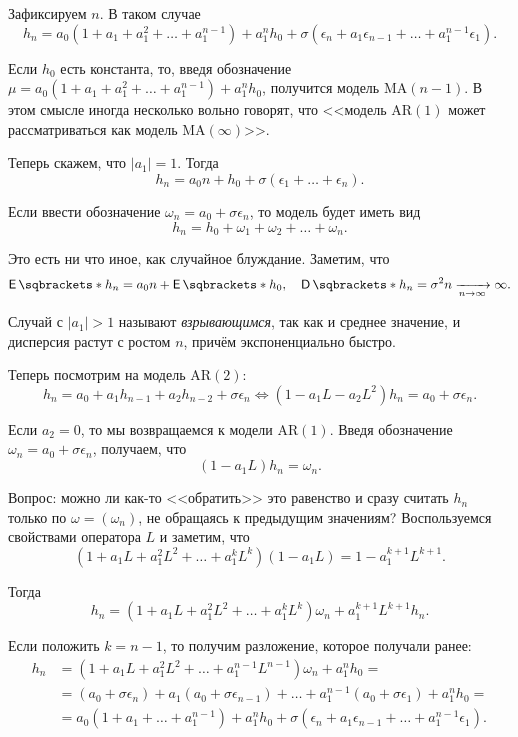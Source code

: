 Зафиксируем \(n\). В таком случае
\[
	h_{n} = a_{0}(1 + a_{1} + a_{1}^{2} + \ldots + a_{1}^{n - 1}) + 
	a_{1}^{n}h_{0} + \sigma(\epsilon_{n} + a_{1}\epsilon_{n - 1}+ \ldots + 
	a_{1}^{n - 1}\epsilon_{1}).
\]

Если \(h_{0}\) есть константа, то, введя обозначение \(\mu = a_{0}(1 + a_{1} + 
a_{1}^{2} + \ldots + a_{1}^{n - 1}) + a_{1}^{n}h_{0}\), получится модель 
\(\mathrm{MA}(n - 1)\). В этом смысле иногда несколько вольно говорят, что 
<<модель \(\mathrm{AR}(1)\) может рассматриваться как модель 
\(\mathrm{MA}(\infty)\)>>.

Теперь скажем, что \(|a_{1}| = 1\). Тогда
\[
	h_{n} = a_{0}n + h_{0} + \sigma(\epsilon_{1} + \ldots + \epsilon_{n}).
\]

Если ввести обозначение \(\omega_{n} = a_{0} + \sigma\epsilon_{n}\), то модель 
будет иметь вид
\[
	h_{n} = h_{0} + \omega_{1} + \omega_{2} + \ldots + \omega_{n}.
\]

Это есть ни что иное, как случайное блуждание. Заметим, что
\[
	\E{h_{n}} = a_{0}n + \E{h_{0}}, \quad \D{h_{n}} = \sigma^{2}n 
	\xrightarrow[n \to \infty]{} \infty.
\]

Случай с \(|a_{1}| > 1\) называют \emph{взрывающимся}, так как и среднее 
значение, и дисперсия растут с ростом \(n\), причём экспоненциально быстро.

Теперь посмотрим на модель \(\mathrm{AR}(2)\):
\[
	h_{n} = a_{0} + a_{1}h_{n - 1} + a_{2}h_{n - 2} + \sigma\epsilon_{n} \iff 
	(1 - a_{1}L - a_{2}L^{2})h_{n} = a_{0} + \sigma\epsilon_{n}.
\]

Если \(a_{2} = 0\), то мы возвращаемся к модели \(\mathrm{AR}(1)\). Введя 
обозначение \(\omega_{n} = a_{0} + \sigma\epsilon_{n}\), получаем, что
\[
	(1 - a_{1}L)h_{n} = \omega_{n}.
\]

Вопрос: можно ли как-то <<обратить>> это равенство и сразу считать \(h_{n}\) 
только по \(\omega = (\omega_{n})\), не обращаясь к предыдущим значениям? 
Воспользуемся свойствами оператора \(L\) и заметим, что
\[
	(1 + a_{1}L + a_{1}^{2}L^{2} + \ldots + a_{1}^{k}L^{k})(1 - a_{1}L) = 1 - 
	a_{1}^{k + 1}L^{k + 1}.
\]

Тогда
\[
	h_{n} = (1 + a_{1}L + a_{1}^{2}L^{2} + \ldots + a_{1}^{k}L^{k})\omega_{n} + 
	a_{1}^{k + 1}L^{k + 1}h_{n}.
\]

Если положить \(k = n - 1\), то получим разложение, которое получали ранее:
\begin{align*}
	h_{n} &= (1 + a_{1}L + a_{1}^{2}L^{2} + \ldots + a_{1}^{n - 1}L^{n - 
	1})\omega_{n} + a_{1}^{n}h_{0} = \\
	&= (a_{0} + \sigma\epsilon_{n}) + a_{1}(a_{0} + \sigma\epsilon_{n - 1}) + 
	\ldots + a_{1}^{n - 1}(a_{0} + \sigma\epsilon_{1}) + a_{1}^{n}h_{0} = \\
	&= a_{0}(1 + a_{1} + \ldots + a_{1}^{n - 1}) + a_{1}^{n}h_{0} + 
	\sigma(\epsilon_{n} + a_{1}\epsilon_{n - 1} + \ldots + a_{1}^{n - 
	1}\epsilon_{1}).
\end{align*}

